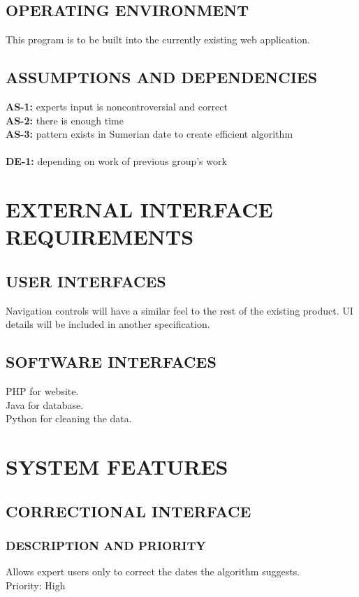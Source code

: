 \documentclass[11pt]{article}
\begin{document}
\subsection{OPERATING ENVIRONMENT}
This program is to be built into the currently existing web application.

\subsection{ASSUMPTIONS AND DEPENDENCIES}
\textbf{AS-1:} experts input is noncontroversial and correct\\
\textbf{AS-2:} there is enough time\\
\textbf{AS-3:} pattern exists in Sumerian date to create efficient algorithm\\
\\
\textbf{DE-1:} depending on work of previous group’s work


\section{EXTERNAL INTERFACE REQUIREMENTS}
\subsection{USER INTERFACES}
Navigation controls will have a similar feel to the rest of the existing product.
UI details will be included in another specification.

\subsection{SOFTWARE INTERFACES}
PHP for website.\\
Java for database.\\
Python for cleaning the data.

\section{SYSTEM FEATURES}

\subsection{CORRECTIONAL INTERFACE}
\subsubsection{DESCRIPTION AND PRIORITY}
Allows expert users only to correct the dates the algorithm suggests.\\
Priority: High
\end{document}
